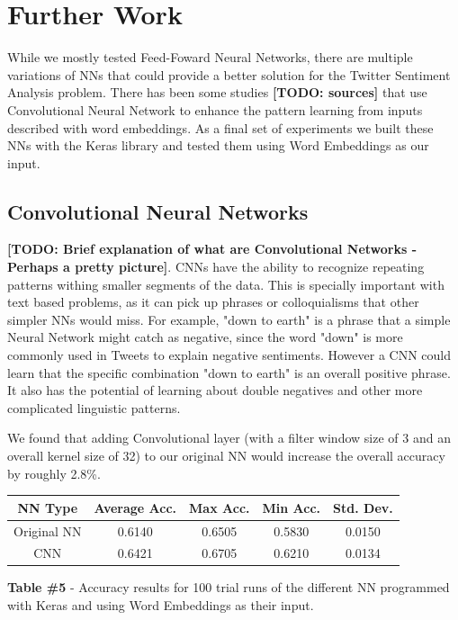 \documentclass[11pt,onecolumn]{article} %
\begin{document}
\section{Further Work}
While we mostly tested Feed-Foward Neural Networks, there are multiple variations of NNs that could provide a better solution for the Twitter Sentiment Analysis problem. There has been some studies \textbf{[TODO: sources]} that use Convolutional Neural Network to enhance the pattern learning from inputs described with word embeddings. As a final set of experiments we built these NNs with the Keras library and tested them using Word Embeddings as our input.

\subsection{Convolutional Neural Networks}
\textbf{[TODO: Brief explanation of what are Convolutional Networks - Perhaps a pretty picture]}. CNNs have the ability to recognize repeating patterns withing smaller segments of the data. This is specially important with text based problems, as it can pick up phrases or colloquialisms that other simpler NNs would miss. For example, "down to earth" is a phrase that a simple Neural Network might catch as negative, since the word "down" is more commonly used in Tweets to explain negative sentiments. However a CNN could learn that the specific combination "down to earth" is an overall positive phrase. It also has the potential of learning about double negatives and other more complicated linguistic patterns.
\par We found that adding Convolutional layer (with a filter window size of 3 and an overall kernel size of 32) to our original NN would increase the overall accuracy by roughly 2.8\%.




\begin{center}
	\begin{tabular}{ | c | c | c | c | c |}
		\hline
		NN Type & Average Acc. & Max Acc. & Min Acc. & Std. Dev. \\
		\hline
		Original NN & 0.6140 &	0.6505 & 0.5830 & 0.0150 \\
		\hline
		CNN & 0.6421 & 0.6705 & 0.6210 & 0.0134 \\
		\hline
	\end{tabular}
	\newline
	\newline
	\textbf{Table \#5} - Accuracy results for 100 trial runs of the different NN programmed with Keras and using Word Embeddings as their input.
\end{center}
\end{document}
